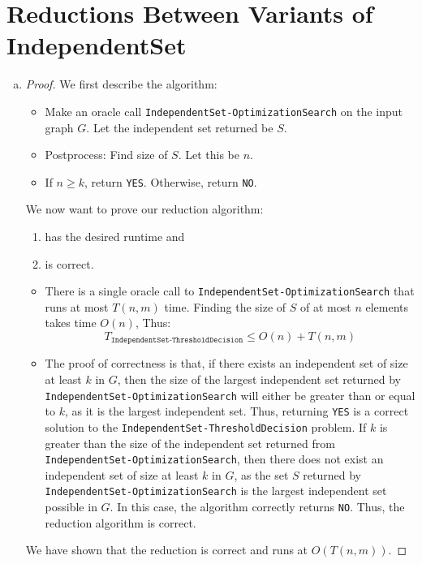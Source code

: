 \documentclass[11pt]{scrartcl}
\theoremstyle{dotlessP}
\theoremstyle{dotlessN}
\begin{document}
\section{Reductions Between Variants of IndependentSet}
\begin{enumerate}[(a)]
	\item 
		\begin{proof}
			We first describe the algorithm:
			\begin{itemize}
				\item Make an oracle call \texttt{IndependentSet-OptimizationSearch} on the input graph $G$. Let the independent set returned be $S$.
				\item Postprocess: Find size of $S$. Let this be $n$.
				\item If $n \geq k$, return \texttt{YES}. Otherwise, return \texttt{NO}.
			\end{itemize}
			We now want to prove our reduction algorithm:
			\begin{enumerate}[1.]
				\item has the desired runtime and
				\item is correct.
			\end{enumerate}
			\begin{itemize}
				\item There is a single oracle call to \texttt{IndependentSet-OptimizationSearch} that runs at most $T(n,m)$ time. Finding the size of $S$ of at most $n$ elements takes time $O(n)$, Thus:
					 \[
						 T_{\texttt{IndependentSet-ThresholdDecision}} \leq O(n) + T(n,m) 
					 \]
				 \item The proof of correctness is that, if there exists an independent set of size at least $k$ in $G$, then the size of the largest independent set returned by \texttt{IndependentSet-OptimizationSearch} will either be greater than or equal to $k$, as it is the largest independent set. Thus, returning \texttt{YES} is a correct solution to the \texttt{IndependentSet-ThresholdDecision} problem. If $k$ is greater than the size of the independent set returned from \texttt{IndependentSet-OptimizationSearch}, then there does not exist an independent set of size at least $k$ in $G$, as the set $S$ returned by \texttt{IndependentSet-OptimizationSearch} is the largest independent set possible in $G$. In this case, the algorithm correctly returns \texttt{NO}. Thus, the reduction algorithm is correct.
			\end{itemize}
			We have shown that the reduction is correct and runs at $O(T(n,m))$.
		\end{proof}

\end{enumerate}
\end{document}
